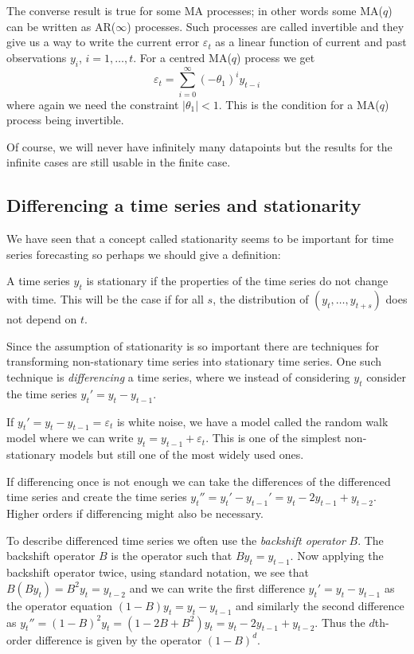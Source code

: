 \documentclass[a4paper, 12pt]{scrartcl}
\begin{document}
The converse result is true for some MA processes; in other words some MA($q$) can be written as AR($\infty$) processes.
Such processes are called invertible and they give us a way to write the current error $\varepsilon_t$ as a linear function of current and past observations $y_i$, $i=1,\dots,t$.
For a centred MA($q$) process we get
\begin{equation*}
	\varepsilon_t=\sum_{i=0}^{\infty}\left(-\theta_1\right)^iy_{t-i}
\end{equation*}
where again we need the constraint $|\theta_1|<1$.
This is the condition for a MA($q$) process being invertible.

Of course, we will never have infinitely many datapoints but the results for the infinite cases are still usable in the finite case.

\subsection{Differencing a time series and stationarity}
We have seen that a concept called stationarity seems to be important for time series forecasting so perhaps we should give a definition:

A time series $y_t$ is stationary if the properties of the time series do not change with time.
This will be the case if for all $s$, the distribution of $\left(y_t, \dots,y_{t+s}\right)$ does not depend on $t$.

Since the assumption of stationarity is so important there are techniques for transforming non-stationary time series into stationary time series.
One such technique is \emph{differencing} a time series, where we instead of considering $y_t$ consider the time series $y_t'=y_t-y_{t-1}$.

If $y_t'=y_t-y_{t-1} = \varepsilon_t$ is white noise, we have a model called the random walk model where we can write $y_t=y_{t-1} + \varepsilon_t$.
This is one of the simplest non-stationary models but still one of the most widely used ones.

If differencing once is not enough we can take the differences of the differenced time series and create the time series $y_t''=y_t'-y_{t-1}'=y_t-2y_{t-1}+y_{t-2}$.
Higher orders if differencing might also be necessary.

To describe differenced time series we often use the \emph{backshift operator} $B$.
The backshift operator $B$ is the operator such that $By_t=y_{t-1}$.
Now applying the backshift operator twice, using standard notation, we see that $B(By_t)=B^2y_t=y_{t-2}$ and we can write the first difference $y_t'=y_t-y_{t-1}$ as the operator equation $(1-B)y_t=y_t-y_{t-1}$ and similarly the second difference as $y_t''=(1-B)^2y_t=(1-2B+B^2)y_t=y_t-2y_{t-1}+y_{t-2}$.
Thus the $d$th-order difference is given by the operator $(1-B)^d$.
\end{document}
